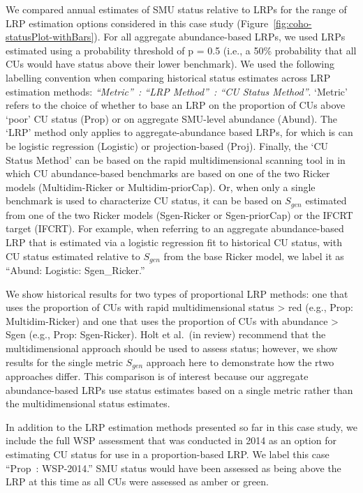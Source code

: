 \documentclass[11pt]{book}
\begin{document}
We compared annual estimates of SMU status relative to LRPs for the range of LRP estimation options considered in this case study (Figure~\ref{fig:coho-statusPlot-withBars}). For all aggregate abundance-based LRPs, we used LRPs estimated using a probability threshold of p = 0.5 (i.e., a 50\% probability that all CUs would have status above their lower benchmark). We used the following labelling convention when comparing historical status estimates across LRP estimation methods: \emph{``Metric''~: ``LRP Method''~: ``CU Status Method''}. `Metric' refers to the choice of whether to base an LRP on the proportion of CUs above `poor' CU status (Prop) or on aggregate SMU-level abundance (Abund). The `LRP' method only applies to aggregate-abundance based LRPs, for which is can be logistic regression (Logistic) or projection-based (Proj). Finally, the `CU Status Method' can be based on the rapid multidimensional scanning tool in in which CU abundance-based benchmarks are based on one of the two Ricker models (Multidim-Ricker or Multidim-priorCap). Or, when only a single benchmark is used to characterize CU status, it can be based on \(S_{gen}\) estimated from one of the two Ricker models (Sgen-Ricker or Sgen-priorCap) or the IFCRT target (IFCRT). For example, when referring to an aggregate abundance-based LRP that is estimated via a logistic regression fit to historical CU status, with CU status estimated relative to \(S_{gen}\) from the base Ricker model, we label it as ``Abund: Logistic: Sgen\_Ricker.''

We show historical results for two types of proportional LRP methods: one that uses the proportion of CUs with rapid multidimensional status \textgreater{} red (e.g., Prop: Multidim-Ricker) and one that uses the proportion of CUs with abundance \textgreater{} Sgen (e.g., Prop: Sgen-Ricker). Holt et al.~(in review) recommend that the multidimensional approach should be used to assess status; however, we show results for the single metric \(S_{gen}\) approach here to demonstrate how the rtwo approaches differ. This comparison is of interest because our aggregate abundance-based LRPs use status estimates based on a single metric rather than the multidimensional status estimates.

In addition to the LRP estimation methods presented so far in this case study, we include the full WSP assessment that was conducted in 2014 as an option for estimating CU status for use in a proportion-based LRP. We label this case ``Prop~: WSP-2014.'' SMU status would have been assessed as being above the LRP at this time as all CUs were assessed as amber or green.
\end{document}
